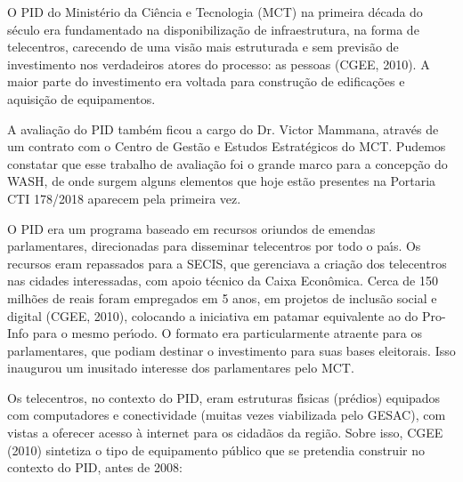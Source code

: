 \documentclass[
12pt,		%
openright,	%
twoside,  %
a4paper,			%
chapter=TITLE,		%
english,			%
french,				%
spanish,			%
brazil				%
]{USPSC-classe/USPSC}
\begin{document}
O PID do Minist\'erio da Ci\^encia e Tecnologia (MCT) na primeira d\'ecada do s\'eculo era fundamentado na disponibiliza\c{c}\~ao de infraestrutura, na forma de telecentros, carecendo de uma vis\~ao mais estruturada e sem previs\~ao de investimento nos verdadeiros atores do processo: as pessoas (CGEE, 2010). A maior parte do investimento era voltada para constru\c{c}\~ao de edifica\c{c}\~oes e aquisi\c{c}\~ao de equipamentos.









A avalia\c{c}\~ao do PID tamb\'em ficou a cargo do Dr. Victor Mammana, atrav\'es de um contrato com o Centro de Gest\~ao e Estudos Estrat\'egicos do MCT. Pudemos constatar que esse trabalho de avalia\c{c}\~ao foi o grande marco para a concep\c{c}\~ao do WASH, de onde surgem alguns elementos que hoje est\~ao presentes na Portaria CTI 178/2018 aparecem pela primeira vez.









O PID era um programa baseado em recursos oriundos de emendas parlamentares, direcionadas para disseminar telecentros por todo o pa\'{\i}s. Os recursos eram repassados para a SECIS, que gerenciava a cria\c{c}\~ao dos telecentros nas cidades interessadas, com apoio t\'ecnico da Caixa Econ\^omica. Cerca de 150 milh\~oes de reais foram empregados em 5 anos, em projetos de inclus\~ao social e digital (CGEE, 2010), colocando a iniciativa em patamar equivalente ao do Pro-Info para o mesmo per\'{\i}odo. O formato era particularmente atraente para os parlamentares, que podiam destinar o investimento para suas bases eleitorais. Isso inaugurou um inusitado interesse dos parlamentares pelo MCT.









Os telecentros, no contexto do PID, eram estruturas f\'{\i}sicas (pr\'edios) equipados com computadores e conectividade (muitas vezes viabilizada pelo GESAC), com vistas a oferecer acesso \`a internet para os cidad\~aos da regi\~ao. Sobre isso, CGEE (2010) sintetiza o tipo de equipamento p\'ublico que se pretendia construir no contexto do PID, antes de 2008:
\end{document}
